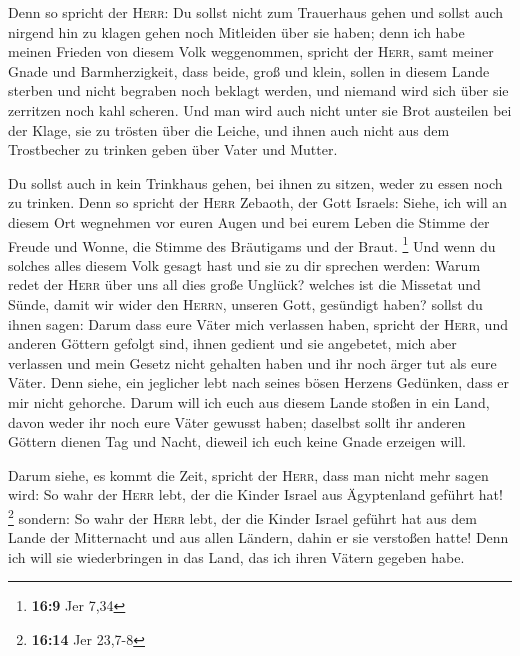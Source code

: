  Denn so spricht der \textsc{Herr}: Du sollst nicht zum
Trauerhaus gehen und sollst auch nirgend hin zu klagen gehen noch
Mitleiden über sie haben; denn ich habe meinen Frieden von diesem Volk
weggenommen, spricht der \textsc{Herr}, samt meiner Gnade und
Barmherzigkeit,  dass beide, groß und klein, sollen in
diesem Lande sterben und nicht begraben noch beklagt werden, und niemand
wird sich über sie zerritzen noch kahl scheren.  Und man
wird auch nicht unter sie Brot austeilen bei der Klage, sie zu trösten
über die Leiche, und ihnen auch nicht aus dem Trostbecher zu trinken
geben über Vater und Mutter.

 Du sollst auch in kein Trinkhaus gehen, bei ihnen zu
sitzen, weder zu essen noch zu trinken.  Denn so spricht
der \textsc{Herr} Zebaoth, der Gott Israels: Siehe, ich will an diesem
Ort wegnehmen vor euren Augen und bei eurem Leben die Stimme der Freude
und Wonne, die Stimme des Bräutigams und der Braut. \footnote{\textbf{16:9}
  Jer 7,34}  Und wenn du solches alles diesem Volk gesagt
hast und sie zu dir sprechen werden: Warum redet der \textsc{Herr} über
uns all dies große Unglück? welches ist die Missetat und Sünde, damit
wir wider den \textsc{Herrn}, unseren Gott, gesündigt haben?
 sollst du ihnen sagen: Darum dass eure Väter mich
verlassen haben, spricht der \textsc{Herr}, und anderen Göttern gefolgt
sind, ihnen gedient und sie angebetet, mich aber verlassen und mein
Gesetz nicht gehalten haben  und ihr noch ärger tut als
eure Väter. Denn siehe, ein jeglicher lebt nach seines bösen Herzens
Gedünken, dass er mir nicht gehorche.  Darum will ich
euch aus diesem Lande stoßen in ein Land, davon weder ihr noch eure
Väter gewusst haben; daselbst sollt ihr anderen Göttern dienen Tag und
Nacht, dieweil ich euch keine Gnade erzeigen will.

 Darum siehe, es kommt die Zeit, spricht der
\textsc{Herr}, dass man nicht mehr sagen wird: So wahr der \textsc{Herr}
lebt, der die Kinder Israel aus Ägyptenland geführt hat! \footnote{\textbf{16:14}
  Jer 23,7-8}  sondern: So wahr der \textsc{Herr} lebt,
der die Kinder Israel geführt hat aus dem Lande der Mitternacht und aus
allen Ländern, dahin er sie verstoßen hatte! Denn ich will sie
wiederbringen in das Land, das ich ihren Vätern gegeben habe.

